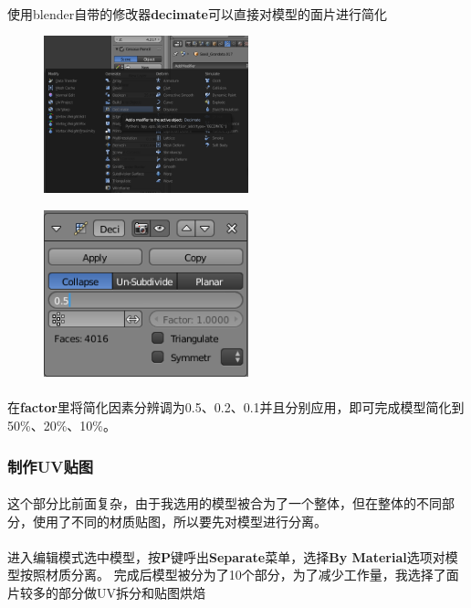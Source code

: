 \documentclass{article}
\begin{document}
\paragraph{}使用blender自带的修改器\textbf{decimate}可以直接对模型的面片进行简化
\begin{figure}[H]
\begin{minipage}{0.5\linewidth}
  \includegraphics[width=16em]{decimate1.png}\\
  \caption{}\label{1-1}
\end{minipage}
\begin{minipage}{0.5\linewidth}
  \includegraphics[width=16em]{decimate2.png}\\
  \caption{}\label{1-2}
\end{minipage}
\end{figure}
\paragraph{}
在\textbf{factor}里将简化因素分辨调为0.5、0.2、0.1并且分别应用，即可完成模型简化到50\%、20\%、10\%。
\subsubsection{制作UV贴图}
\paragraph{}
这个部分比前面复杂，由于我选用的模型被合为了一个整体，但在整体的不同部分，使用了不同的材质贴图，所以要先对模型进行分离。
\paragraph{}
进入编辑模式选中模型，按\textbf{P}键呼出\textbf{Separate}菜单，选择\textbf{By Material}选项对模型按照材质分离。
完成后模型被分为了10个部分，为了减少工作量，我选择了面片较多的部分做UV拆分和贴图烘焙
\end{document}
